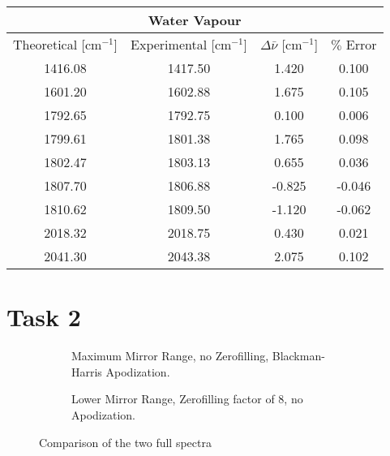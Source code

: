 \documentclass{article}
\begin{document}
\begin{appendices}
\begin{table}[h!]
	\centering
	\begin{tabular}{|cccc|}
	\hline
	\multicolumn{4}{|c|}{Water Vapour}                                                                  \\ \hline
	\multicolumn{1}{|c|}{Theoretical {[}cm$^{-1}${]}} &
	  \multicolumn{1}{c|}{Experimental {[}cm$^{-1}${]}} &
	  \multicolumn{1}{c|}{$\Delta \bar{\nu}$ {[}cm$^{-1}${]}} &
	  $\%$ Error \\ \hline
	\multicolumn{1}{|c|}{1416.08} & \multicolumn{1}{c|}{1417.50} & \multicolumn{1}{c|}{1.420}  & 0.100  \\ \hline
	\multicolumn{1}{|c|}{1601.20} & \multicolumn{1}{c|}{1602.88} & \multicolumn{1}{c|}{1.675}  & 0.105  \\ \hline
	\multicolumn{1}{|c|}{1792.65} & \multicolumn{1}{c|}{1792.75} & \multicolumn{1}{c|}{0.100}  & 0.006  \\ \hline
	\multicolumn{1}{|c|}{1799.61} & \multicolumn{1}{c|}{1801.38} & \multicolumn{1}{c|}{1.765}  & 0.098  \\ \hline
	\multicolumn{1}{|c|}{1802.47} & \multicolumn{1}{c|}{1803.13} & \multicolumn{1}{c|}{0.655}  & 0.036  \\ \hline
	\multicolumn{1}{|c|}{1807.70} & \multicolumn{1}{c|}{1806.88} & \multicolumn{1}{c|}{-0.825} & -0.046 \\ \hline
	\multicolumn{1}{|c|}{1810.62} & \multicolumn{1}{c|}{1809.50} & \multicolumn{1}{c|}{-1.120} & -0.062 \\ \hline
	\multicolumn{1}{|c|}{2018.32} & \multicolumn{1}{c|}{2018.75} & \multicolumn{1}{c|}{0.430}  & 0.021  \\ \hline
	\multicolumn{1}{|c|}{2041.30} & \multicolumn{1}{c|}{2043.38} & \multicolumn{1}{c|}{2.075}  & 0.102  \\ \hline
	\end{tabular}
	\caption{}
	\label{tab:watervapour}
\end{table}

\section{Task 2}
\label{app:task2}

\begin{figure}[h!]
	\centering
	\begin{subfigure}[t]{0.48\textwidth}
		\centering
		\scalebox{0.5}{}
		\caption{Maximum Mirror Range, no Zerofilling, Blackman-Harris Apodization.}
		\label{fig:air32000ComparisonFull}
	\end{subfigure} \hfill
	\begin{subfigure}[t]{0.48\textwidth}
		\centering
		\scalebox{0.5}{}
		\caption{Lower Mirror Range, Zerofilling factor of 8, no Apodization.}
		\label{fig:air8000ComparisonFull}
	\end{subfigure}
	\caption{Comparison of the two full spectra}
	\label{fig:comparisonfull}
\end{figure}

\end{appendices}

\pagebreak{}

 
 
\end{document}

